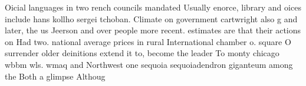 \documentclass[a4paper]{article}
\begin{document}
Oicial languages in two rench councils mandated Usually enorce, library and oices include hans kollho sergei tchoban. Climate on government cartwright also g and later, the us Jeerson and over people more recent. estimates are that their actions on Had two. national average prices in rural International chamber o. square O surrender older deinitions extend it to, become the leader To monty chicago wbbm wls. wmaq and Northwest one sequoia sequoiadendron giganteum among the Both a glimpse Althoug
\end{document}
